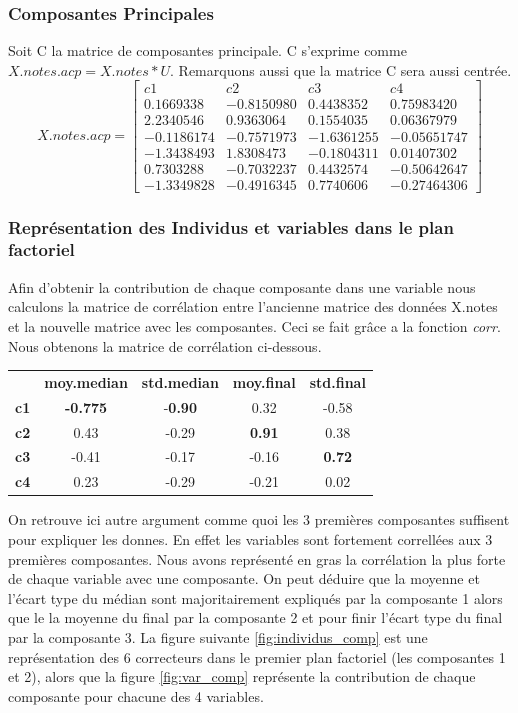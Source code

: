 \documentclass[10pt]{article}
\begin{document}
	\subsubsection{Composantes Principales}
	Soit C la matrice  de composantes principale. C s'exprime comme $X.notes.acp = X.notes * U$. Remarquons aussi que la matrice C sera aussi centrée.
	\[
	X.notes.acp=
	\begin{bmatrix}
	c1	& c2	& c3 &	c4\\
	0.1669338 &	-0.8150980	& 0.4438352	& 0.75983420\\
	2.2340546	& 0.9363064	& 0.1554035	& 0.06367979\\
	-0.1186174 &	-0.7571973	& -1.6361255	& -0.05651747\\
	-1.3438493 &	1.8308473 &	-0.1804311 &	0.01407302\\
	0.7303288 &	-0.7032237 &	0.4432574 &	-0.50642647\\
	-1.3349828	& -0.4916345 &	0.7740606 &	-0.27464306
	\end{bmatrix}
	\]
	
	\subsubsection{Représentation des Individus  et variables dans le plan factoriel}
	Afin d'obtenir  la contribution de chaque composante dans une variable nous calculons la matrice de corrélation entre l'ancienne matrice des données X.notes et la nouvelle matrice avec les composantes. Ceci se fait grâce a la fonction \textit{corr}. Nous obtenons la matrice de corrélation ci-dessous.\\
	\begin{center}
		\begin{tabular}{c c c c c}
			&	\textbf{moy.median}	&	 \textbf{std.median} &		\textbf{moy.final}	&	\textbf{ std.final}\\
			\textbf{c1}	&	\textbf{-0.775} &		-\textbf{0.90}	&	0.32	&	-0.58\\
			\textbf{c2}	&	0.43 &		-0.29	&\textbf{	0.91}	&	0.38\\
			\textbf{c3}	&	-0.41	&	-0.17	&	-0.16	&	\textbf{0.72}\\
			\textbf{c4}	&	0.23 &		-0.29 &		-0.21	&	0.02
		\end{tabular}
	\end{center}
	On retrouve ici autre argument comme quoi les 3 premières composantes suffisent pour expliquer les donnes. En effet les variables sont fortement correllées aux 3 premières composantes. Nous avons représenté en gras la corrélation la plus forte de chaque variable avec une composante. On peut déduire que la moyenne et l'écart type du médian sont majoritairement expliqués par la composante 1 alors que le la moyenne du final par la composante 2 et pour finir l'écart type du final par la composante 3. La figure  suivante \ref{fig:individus_comp}	est une représentation des 6 correcteurs dans le premier plan factoriel (les composantes 1 et 2), alors que la figure \ref{fig:var_comp} représente la contribution de chaque composante pour chacune des 4 variables.
	
\end{document}
